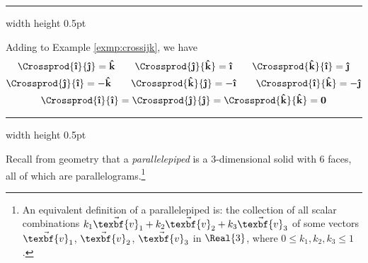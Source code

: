 \vspace{2mm}
\hrule width \textwidth height 0.5pt
\begin{exmp}\label{exmp:crossijkfull}
 Adding to Example \ref{exmp:crossijk}, we have
 \begin{gather*}
  \Crossprod{\boldsymbol{\hat{\textbf{\i}}}}{\boldsymbol{\hat{\textbf{\j}}}} = \boldsymbol{\hat{\textbf{k}}} \qquad \Crossprod{\boldsymbol{\hat{\textbf{\j}}}}{\boldsymbol{\hat{\textbf{k}}}} = \boldsymbol{\hat{\textbf{\i}}} \qquad
   \Crossprod{\boldsymbol{\hat{\textbf{k}}}}{\boldsymbol{\hat{\textbf{\i}}}} = \boldsymbol{\hat{\textbf{\j}}}\\
  \Crossprod{\boldsymbol{\hat{\textbf{\j}}}}{\boldsymbol{\hat{\textbf{\i}}}} = -\boldsymbol{\hat{\textbf{k}}} \qquad \Crossprod{\boldsymbol{\hat{\textbf{k}}}}{\boldsymbol{\hat{\textbf{\j}}}} = -\boldsymbol{\hat{\textbf{\i}}} \qquad
   \Crossprod{\boldsymbol{\hat{\textbf{\i}}}}{\boldsymbol{\hat{\textbf{k}}}} = -\boldsymbol{\hat{\textbf{\j}}}\\
  \Crossprod{\boldsymbol{\hat{\textbf{\i}}}}{\boldsymbol{\hat{\textbf{\i}}}} = \Crossprod{\boldsymbol{\hat{\textbf{\j}}}}{\boldsymbol{\hat{\textbf{\j}}}} = \Crossprod{\boldsymbol{\hat{\textbf{k}}}}{\boldsymbol{\hat{\textbf{k}}}} =
  \textbf{0}
 \end{gather*}
\end{exmp}
\hrule width \textwidth height 0.5pt
\vspace{4mm}

Recall from geometry that a \emph{parallelepiped} is a 3-dimensional solid with 6 faces, all of
which are parallelograms.\footnote{An equivalent definition of a  parallelepiped is: the collection of
all scalar combinations $k_{1}\vec{\texbf{v}}_{1} + k_{2}\vec{\texbf{v}}_{2} + k_{3}\vec{\texbf{v}}_{3}$ of some vectors
$\vec{\texbf{v}}_{1}$, $\vec{\texbf{v}}_{2}$, $\vec{\texbf{v}}_{3}$ in $\Real{3}$, where $0 \le k_{1}, k_{2}, k_{3} \le 1$.}

